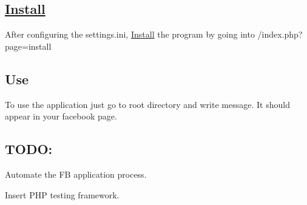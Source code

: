 \subsection*{\hyperlink{classInstall}{Install}}

After configuring the settings.\-ini, \hyperlink{classInstall}{Install} the program by going into /index.php?page=install

\subsection*{Use}

To use the application just go to root directory and write message. It should appear in your facebook page.

\subsection*{T\-O\-D\-O\-:}


\begin{DoxyEnumerate}
\item Automate the F\-B application process.
\item Insert P\-H\-P testing framework. 
\end{DoxyEnumerate}